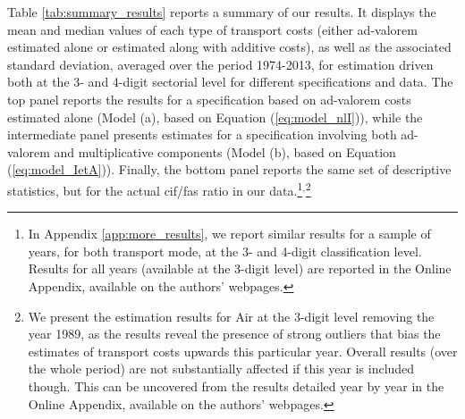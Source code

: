 \documentclass[a4paper,11pt]{article}
\begin{document}
Table \ref{tab:summary_results} reports a summary of our results.
It displays the mean and median values of each type of transport costs (either ad-valorem estimated alone or estimated along with additive costs), as well as the associated standard deviation, averaged over the period 1974-2013, for estimation driven both at the 3- and 4-digit sectorial level for different specifications and data.
The top panel reports the results for a specification based on ad-valorem costs estimated alone (Model (a), based on Equation (\ref{eq:model_nlI})), while the intermediate panel presents estimates for a specification involving both ad-valorem and multiplicative components (Model (b), based on Equation (\ref{eq:model_IetA})).
Finally, the bottom panel reports the same set of descriptive statistics, but for the actual cif/fas ratio in our data.\footnote{In Appendix \ref{app:more_results}, we report similar results for a sample of years, for both transport mode, at the 3- and 4-digit classification level.
Results for all years (available at the 3-digit level) are reported in the Online Appendix, available on the authors' webpages.}$^{,}$\footnote{We present the estimation results for Air at the 3-digit level removing the year 1989, as the results reveal the presence of strong outliers that bias the estimates of transport costs upwards this particular year.
Overall results (over the whole period) are not substantially affected if this year is included though.
This can be uncovered from the results detailed year by year in the Online Appendix, available on the authors' webpages.}
\end{document}
